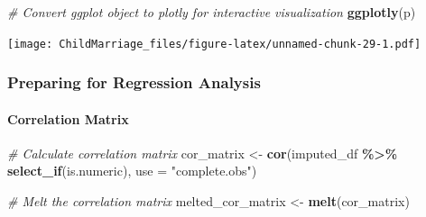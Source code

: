 \documentclass[
]{article}
\newenvironment{Shaded}{\begin{snugshade}}{\end{snugshade}}
\newcommand{\AttributeTok}[1]{\textcolor[rgb]{0.13,0.29,0.53}{#1}}
\newcommand{\CommentTok}[1]{\textcolor[rgb]{0.56,0.35,0.01}{\textit{#1}}}
\newcommand{\FunctionTok}[1]{\textcolor[rgb]{0.13,0.29,0.53}{\textbf{#1}}}
\newcommand{\NormalTok}[1]{#1}
\newcommand{\OtherTok}[1]{\textcolor[rgb]{0.56,0.35,0.01}{#1}}
\newcommand{\SpecialCharTok}[1]{\textcolor[rgb]{0.81,0.36,0.00}{\textbf{#1}}}
\newcommand{\StringTok}[1]{\textcolor[rgb]{0.31,0.60,0.02}{#1}}
\begin{document}
\begin{Shaded}
\begin{Highlighting}[]
\CommentTok{\# Convert ggplot object to plotly for interactive visualization}
\FunctionTok{ggplotly}\NormalTok{(p)}
\end{Highlighting}
\end{Shaded}

\texttt{[image: ChildMarriage\_files/figure-latex/unnamed-chunk-29-1.pdf]}

\hypertarget{preparing-for-regression-analysis}{%
\subsubsection{Preparing for Regression
Analysis}\label{preparing-for-regression-analysis}}

\hypertarget{correlation-matrix}{%
\paragraph{Correlation Matrix}\label{correlation-matrix}}

\begin{Shaded}
\begin{Highlighting}[]
\CommentTok{\# Calculate correlation matrix}
\NormalTok{cor\_matrix }\OtherTok{\textless{}{-}} \FunctionTok{cor}\NormalTok{(imputed\_df }\SpecialCharTok{\%\textgreater{}\%} \FunctionTok{select\_if}\NormalTok{(is.numeric), }\AttributeTok{use =} \StringTok{"complete.obs"}\NormalTok{)}

\CommentTok{\# Melt the correlation matrix}
\NormalTok{melted\_cor\_matrix }\OtherTok{\textless{}{-}} \FunctionTok{melt}\NormalTok{(cor\_matrix)}
\end{Highlighting}
\end{Shaded}
\end{document}

